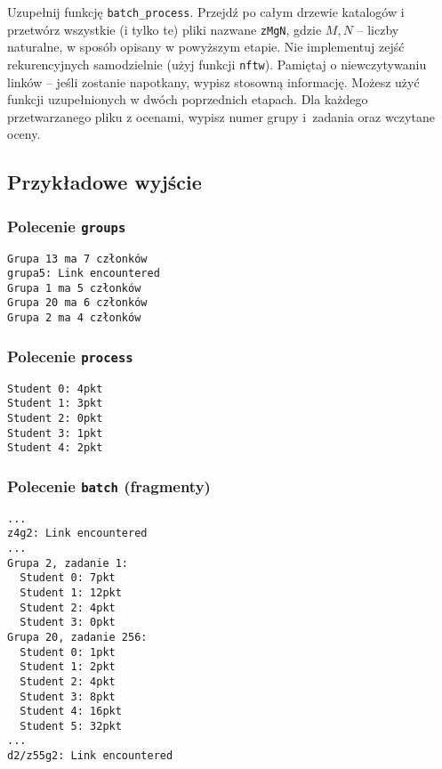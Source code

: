 \documentclass[addpoints,a4paper]{exam}
\begin{document}
\begin{questions}
    \nopagebreak[4]
  \question[5]
    Uzupełnij funkcję \verb|batch_process|. Przejdź po całym drzewie katalogów i przetwórz wszystkie (i tylko te) pliki nazwane \verb|zMgN|, gdzie $M,N$ -- liczby naturalne, w sposób opisany w powyższym etapie. Nie implementuj zejść rekurencyjnych samodzielnie (użyj funkcji \verb|nftw|). Pamiętaj o niewczytywaniu linków -- jeśli zostanie napotkany, wypisz stosowną informację. Możesz użyć funkcji uzupełnionych w dwóch poprzednich etapach. Dla każdego przetwarzanego pliku z ocenami, wypisz numer grupy i~zadania oraz wczytane oceny.
\end{questions}

\subsection*{Przykładowe wyjście}

\subsubsection*{Polecenie \texttt{groups}}

\begin{verbatim}
Grupa 13 ma 7 członków
grupa5: Link encountered
Grupa 1 ma 5 członków
Grupa 20 ma 6 członków
Grupa 2 ma 4 członków
\end{verbatim}

\subsubsection*{Polecenie \texttt{process}}

\begin{verbatim}
Student 0: 4pkt
Student 1: 3pkt
Student 2: 0pkt
Student 3: 1pkt
Student 4: 2pkt
\end{verbatim}

\subsubsection*{Polecenie \texttt{batch} (fragmenty)}

\begin{verbatim}
...
z4g2: Link encountered
...
Grupa 2, zadanie 1:
  Student 0: 7pkt
  Student 1: 12pkt
  Student 2: 4pkt
  Student 3: 0pkt
Grupa 20, zadanie 256:
  Student 0: 1pkt
  Student 1: 2pkt
  Student 2: 4pkt
  Student 3: 8pkt
  Student 4: 16pkt
  Student 5: 32pkt
...
d2/z55g2: Link encountered
\end{verbatim}
\end{document}
